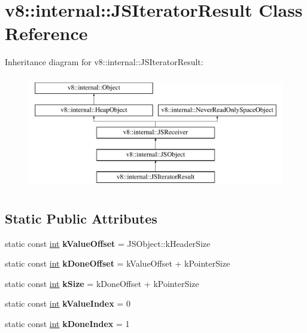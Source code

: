 \hypertarget{classv8_1_1internal_1_1JSIteratorResult}{}\section{v8\+:\+:internal\+:\+:J\+S\+Iterator\+Result Class Reference}
\label{classv8_1_1internal_1_1JSIteratorResult}
Inheritance diagram for v8\+:\+:internal\+:\+:J\+S\+Iterator\+Result\+:\begin{figure}[H]
\begin{center}
\leavevmode
\includegraphics[height=5.000000cm]{classv8_1_1internal_1_1JSIteratorResult}
\end{center}
\end{figure}
\subsection*{Static Public Attributes}
\begin{DoxyCompactItemize}
\item 
\mbox{\label{classv8_1_1internal_1_1JSIteratorResult_ad3bd3b361b771298e2f3d7fe97895fba}} 
static const \mbox{\hyperlink{classint}{int}} {\bfseries k\+Value\+Offset} = J\+S\+Object\+::k\+Header\+Size
\item 
\mbox{\label{classv8_1_1internal_1_1JSIteratorResult_aae1880578295dc785f39437c190b6f85}} 
static const \mbox{\hyperlink{classint}{int}} {\bfseries k\+Done\+Offset} = k\+Value\+Offset + k\+Pointer\+Size
\item 
\mbox{\label{classv8_1_1internal_1_1JSIteratorResult_a5d61d168283f7c3b16a3f794f3ca5259}} 
static const \mbox{\hyperlink{classint}{int}} {\bfseries k\+Size} = k\+Done\+Offset + k\+Pointer\+Size
\item 
\mbox{\label{classv8_1_1internal_1_1JSIteratorResult_a6703ddfcb73d4a0e2eaaf69dcd33344b}} 
static const \mbox{\hyperlink{classint}{int}} {\bfseries k\+Value\+Index} = 0
\item 
\mbox{\label{classv8_1_1internal_1_1JSIteratorResult_aa8d774f7d9a32a503250b798c03e599d}} 
static const \mbox{\hyperlink{classint}{int}} {\bfseries k\+Done\+Index} = 1
\end{DoxyCompactItemize}
